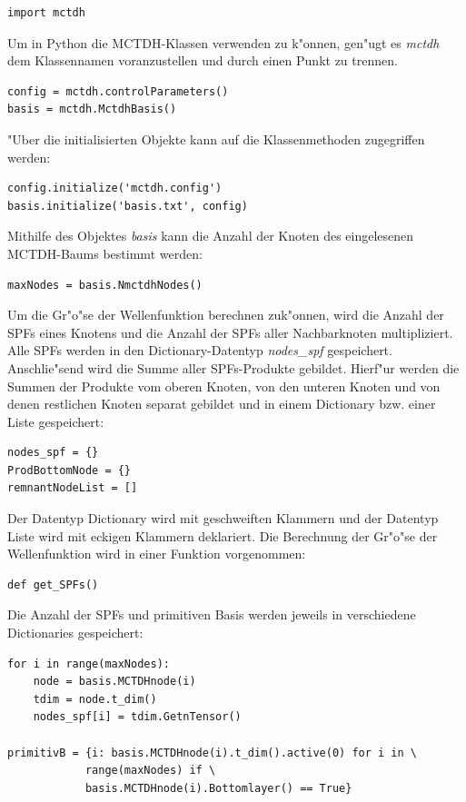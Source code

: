 \begin{verbatim}
import mctdh
\end{verbatim}

Um in Python die MCTDH-Klassen verwenden zu k"onnen, gen"ugt es \textit{mctdh} dem Klassennamen voranzustellen und durch einen
Punkt zu trennen.

\begin{verbatim}
config = mctdh.controlParameters()
basis = mctdh.MctdhBasis()
\end{verbatim}

"Uber die initialisierten Objekte kann auf die Klassenmethoden zugegriffen werden: 
\begin{verbatim}
config.initialize('mctdh.config')
basis.initialize('basis.txt', config)
\end{verbatim}

Mithilfe des Objektes \textit{basis} kann die Anzahl der Knoten des eingelesenen MCTDH-Baums bestimmt werden:
\begin{verbatim}
maxNodes = basis.NmctdhNodes()
\end{verbatim}

Um die Gr"o"se der Wellenfunktion berechnen zuk"onnen, wird die Anzahl der SPFs eines Knotens
und die Anzahl der SPFs aller Nachbarknoten multipliziert.
Alle SPFs werden in den Dictionary-Datentyp \textit{nodes\_spf} gespeichert. 
Anschlie"send wird die Summe aller SPFs-Produkte gebildet.
Hierf"ur werden die Summen der Produkte vom oberen Knoten, von den unteren Knoten und von denen
restlichen Knoten separat gebildet und in einem Dictionary bzw. einer Liste gespeichert:

\begin{verbatim}
nodes_spf = {}
ProdBottomNode = {}
remnantNodeList = []
\end{verbatim}

Der Datentyp Dictionary wird mit geschweiften Klammern und der 
Datentyp Liste wird mit eckigen Klammern deklariert.
Die Berechnung der Gr"o"se der Wellenfunktion wird in einer Funktion vorgenommen:

\begin{verbatim}
def get_SPFs()
\end{verbatim}

Die Anzahl der SPFs und primitiven Basis werden jeweils in verschiedene Dictionaries gespei\-chert:

\begin{verbatim}
for i in range(maxNodes):
    node = basis.MCTDHnode(i)
    tdim = node.t_dim()
    nodes_spf[i] = tdim.GetnTensor() 

primitivB = {i: basis.MCTDHnode(i).t_dim().active(0) for i in \
            range(maxNodes) if \
            basis.MCTDHnode(i).Bottomlayer() == True}
\end{verbatim}

